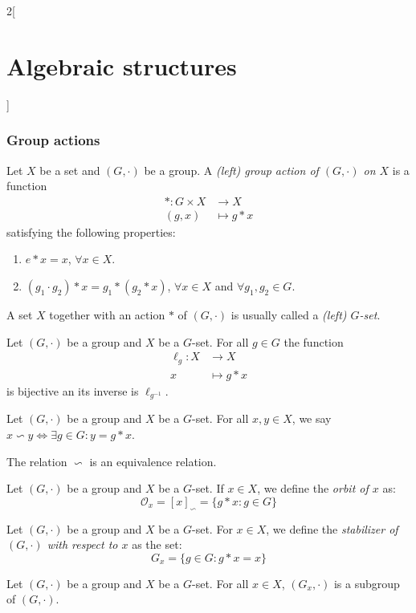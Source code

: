 \documentclass[../../../main.tex]{subfiles}
\begin{document}
\begin{multicols}{2}[\section{Algebraic structures}]
\subsubsection{Group actions}
\begin{definition}
    Let $X$ be a set and $(G,\cdot)$ be a group. A \textit{(left) group action of $(G,\cdot)$ on $X$} is a function 
    \begin{align*}
        *:G\times X&\longrightarrow X\\
        (g,x)&\longmapsto g*x
    \end{align*}
    satisfying the following properties:
    \begin{enumerate}
        \item $e*x=x$, $\forall x\in X$.
        \item $(g_1\cdot g_2)*x=g_1*(g_2*x)$, $\forall x\in X$ and $\forall g_1,g_2\in G$.
    \end{enumerate}
    A set $X$ together with an action $*$ of $(G,\cdot)$ is usually called a \textit{(left) $G$-set}.
\end{definition}
\begin{lemma}
    Let $(G,\cdot)$ be a group and $X$ be a $G$-set. For all $g\in G$ the function
    \begin{align*}
        \ell_g:X&\longrightarrow X\\
        x&\longmapsto g*x
    \end{align*} is bijective an its inverse is $\ell_{g^{-1}}$.
\end{lemma}
\begin{definition}
    Let $(G,\cdot)$ be a group and $X$ be a $G$-set. For all $x,y\in X$, we say $x\backsim y\iff\exists g\in G:y=g*x$.
\end{definition}
\begin{lemma}
    The relation $\backsim$ is an equivalence relation.
\end{lemma}
\begin{definition}
    Let $(G,\cdot)$ be a group and $X$ be a $G$-set. If $x\in X$, we define the \textit{orbit of $x$} as: $$\mathcal{O}_x=[x]_\backsim=\{g*x:g\in G\}$$
\end{definition}
\begin{definition}
    Let $(G,\cdot)$ be a group and $X$ be a $G$-set. For $x\in X$, we define the \textit{stabilizer of $(G,\cdot)$ with respect to $x$} as the set: $$G_x=\{g\in G:g*x=x\}$$
\end{definition}
\begin{prop}
    Let $(G,\cdot)$ be a group and $X$ be a $G$-set. For all $x\in X$, $(G_x,\cdot)$ is a subgroup of $(G,\cdot)$.

\end{prop}
\end{multicols}
\end{document}
